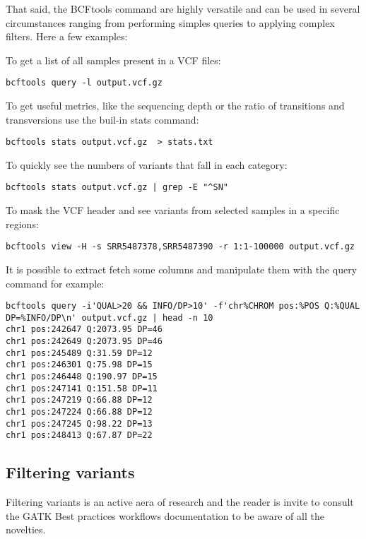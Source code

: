 That said, the BCFtools command are highly versatile and can be used in several circumstances ranging from performing simples queries to applying complex filters. Here a few examples:

To get a list of all samples present in a VCF files:

\begin{verbatim}
bcftools query -l output.vcf.gz
\end{verbatim}

To get useful metrics, like the sequencing depth or the ratio of transitions and transversions use the buil-in stats command:
\begin{verbatim}
bcftools stats output.vcf.gz  > stats.txt
\end{verbatim}

To quickly see the numbers of variants that fall in each category:
\begin{verbatim}
bcftools stats output.vcf.gz | grep -E "^SN"
\end{verbatim}

To mask the VCF header and see variants from selected samples in a specific regions:
\begin{verbatim}
bcftools view -H -s SRR5487378,SRR5487390 -r 1:1-100000 output.vcf.gz
\end{verbatim}


It is possible to extract fetch some columns and manipulate them with the query command for example:
\begin{verbatim}
bcftools query -i'QUAL>20 && INFO/DP>10' -f'chr%CHROM pos:%POS Q:%QUAL DP=%INFO/DP\n' output.vcf.gz | head -n 10
chr1 pos:242647 Q:2073.95 DP=46
chr1 pos:242649 Q:2073.95 DP=46
chr1 pos:245489 Q:31.59 DP=12
chr1 pos:246301 Q:75.98 DP=15
chr1 pos:246448 Q:190.97 DP=15
chr1 pos:247141 Q:151.58 DP=11
chr1 pos:247219 Q:66.88 DP=12
chr1 pos:247224 Q:66.88 DP=12
chr1 pos:247245 Q:98.22 DP=13
chr1 pos:248413 Q:67.87 DP=22

\end{verbatim}





\subsection{Filtering variants}


Filtering variants is an active aera of research and the reader is invite to consult the GATK Best practices workflows documentation to be aware of all the novelties.

